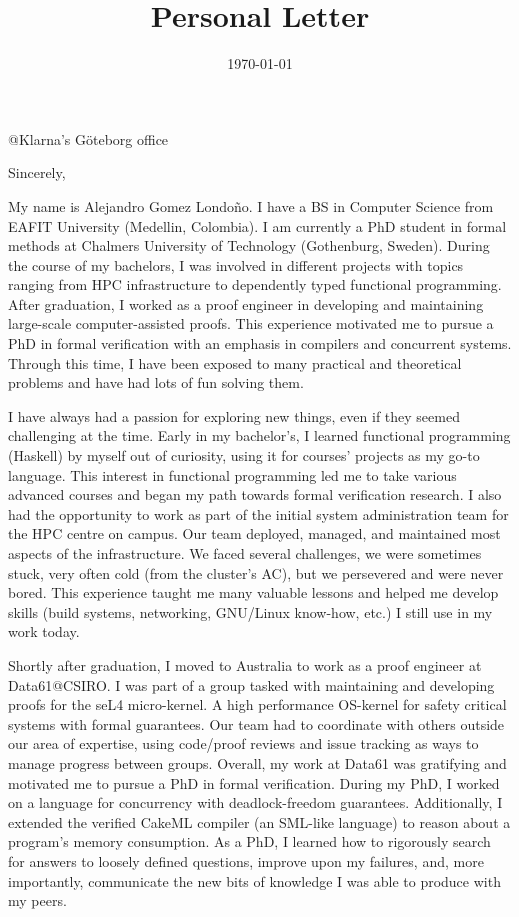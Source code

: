 \documentclass[11pt,a4paper,sans]{moderncv}        %
\title{Personal Letter}                               %
\begin{document}

          {@Klarna's Göteborg office}
\date{\today}

\opening{}

\closing{Sincerely,}

\makelettertitle

\justify

My name is Alejandro Gomez Londoño. I have a BS in Computer Science
from EAFIT University (Medellin, Colombia). I am currently a PhD
student in formal methods at Chalmers University of Technology
(Gothenburg, Sweden). During the course of my bachelors, I was
involved in different projects with topics ranging from HPC
infrastructure to dependently typed functional programming. After
graduation, I worked as a proof engineer in developing and maintaining
large-scale computer-assisted proofs. This experience motivated me to
pursue a PhD in formal verification with an emphasis in compilers and
concurrent systems. Through this time, I have been exposed to many
practical and theoretical problems and have had lots of fun solving
them.

I have always had a passion for exploring new things, even if they
seemed challenging at the time.
%
Early in my bachelor's, I learned functional programming (Haskell) by
myself out of curiosity, using it for courses' projects as my go-to
language. This interest in functional programming led me to take
various advanced courses and began my path towards formal verification
research.
%
I also had the opportunity to work as part of the initial system
administration team for the HPC centre on campus. Our team deployed,
managed, and maintained most aspects of the infrastructure. We faced
several challenges, we were sometimes stuck, very often cold (from the
cluster's AC), but we persevered and were never bored. This experience
taught me many valuable lessons and helped me develop skills (build
systems, networking, GNU/Linux know-how, etc.) I still use in my work
today.

Shortly after graduation, I moved to Australia to work as a proof
engineer at Data61@CSIRO. I was part of a group tasked with
maintaining and developing proofs for the seL4 micro-kernel.  A high
performance OS-kernel for safety critical systems with formal
guarantees. Our team had to coordinate with others outside our area of
expertise, using code/proof reviews and issue tracking as ways to
manage progress between groups. Overall, my work at Data61 was
gratifying and motivated me to pursue a PhD in formal verification.
%
During my PhD, I worked on a language for concurrency with
deadlock-freedom guarantees. Additionally, I extended the verified
CakeML compiler (an SML-like language) to reason about a program's
memory consumption. As a PhD, I learned how to rigorously search for
answers to loosely defined questions, improve upon my failures, and,
more importantly, communicate the new bits of knowledge I was able to
produce with my peers.
\end{document}
